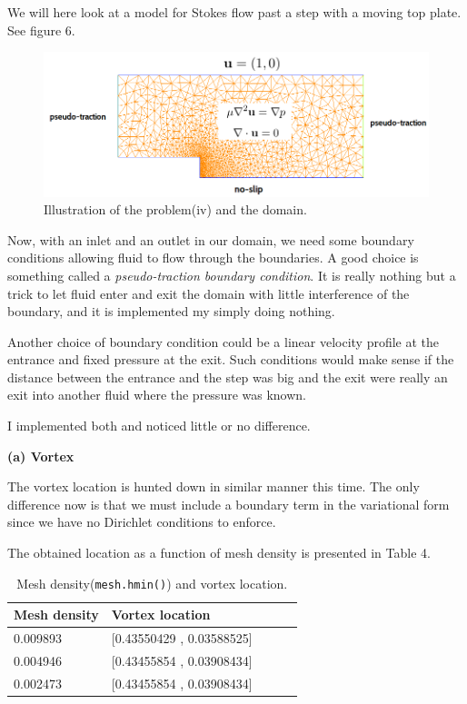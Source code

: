 \documentclass[11pt,a4paper,english]{article}
\numberwithin{equation}{section}
\begin{document}
We will here look at a model for Stokes flow past a step with a moving top plate. See figure 6.

\begin{figure}[h!]
\begin{center}
  \includegraphics[scale=0.3]{stokes_step.png}
  \end{center}
  \caption{Illustration of the problem(iv) and the domain.}
\end{figure}

Now, with an inlet and an outlet in our domain, we need some boundary conditions allowing fluid to flow through the boundaries. A good choice is something called a \emph{pseudo-traction boundary condition}. It is really nothing but a trick to let fluid enter and exit the domain with little interference of the boundary, and it is implemented my simply doing nothing. 

Another choice of boundary condition could be a linear velocity profile at the entrance and fixed pressure at the exit. Such conditions would make sense if the distance between the entrance and the step was big and the exit were really an exit into another fluid where the pressure was known. 

I implemented both and noticed little or no difference. 

\textbf{(a) Vortex}

The vortex location is hunted down in similar manner this time. The only difference now is that we must include a boundary term in the variational form since we have no Dirichlet conditions to enforce.

The obtained location as a function of mesh density is presented in Table 4.

\begin{table}[H]
\centering
\caption{ Mesh density(\texttt{mesh.hmin()}) and vortex location. }
\vspace{3mm}
\begin{tabular}{|l|l|l|l|l|}
\hline
\textbf{Mesh density} & \textbf{Vortex location}    \\
\hline
0.009893 & [0.43550429 , 0.03588525]   \\
\hline
0.004946 & [0.43455854 , 0.03908434]	   \\
\hline
0.002473 & [0.43455854 , 0.03908434]    \\ 
\hline
\end{tabular}
\label{tab:time}
\end{table}
\end{document}
